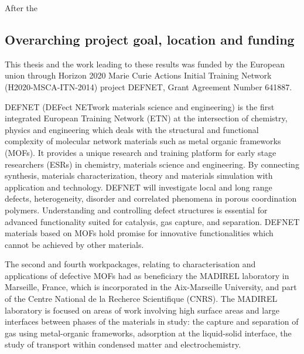 After the 

\subsection*{Overarching project goal, location and funding}

This thesis and the work leading to these results 
was funded by the European union through Horizon 2020 Marie Curie
Actions Initial Training Network (H2020-MSCA-ITN-2014)
project DEFNET, Grant Agreement Number 641887.

DEFNET (DEFect NETwork materials science and engineering) is
the first integrated European Training Network (ETN) at the intersection
of chemistry, physics and engineering which deals with the structural and
functional complexity of molecular network materials such as metal organic 
frameworks (MOFs). It provides a unique research and training platform for
early stage researchers (ESRs) in chemistry, materials science and engineering.
By connecting synthesis, materials characterization, theory and materials simulation
with application and technology. DEFNET will investigate local and long
range defects, heterogeneity, disorder and correlated phenomena in
porous coordination polymers.
Understanding and controlling defect structures is essential for advanced
functionality suited for catalysis, gas capture, and separation. DEFNET
materials based on MOFs hold promise for innovative functionalities which
cannot be achieved by other materials.

The second and fourth workpackages, relating to characterisation and
applications of defective MOFs had as beneficiary the MADIREL 
laboratory in Marseille, France, which is incorporated in the
Aix-Marseille University, and part of the Centre
National de la Recherce Scientifique (CNRS). The MADIREL 
laboratory is focused on areas of work involving high surface
areas and large interfaces between phases of the materials in 
study: the capture and separation of gas using metal-organic 
frameworks, adsorption at the liquid-solid interface,
the study of transport within condensed matter and electrochemistry.